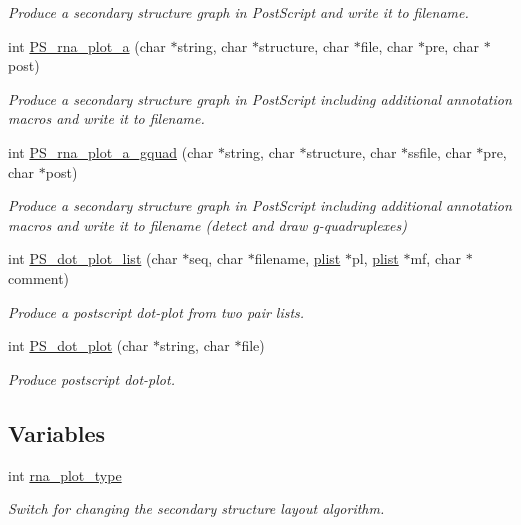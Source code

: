 \begin{DoxyCompactItemize}
\begin{DoxyCompactList}\small\item\em Produce a secondary structure graph in Post\+Script and write it to \textquotesingle{}filename\textquotesingle{}. \end{DoxyCompactList}\item 
int \hyperlink{group__plotting__utils_ga47856b2504b566588785597b6ebb8271}{P\+S\+\_\+rna\+\_\+plot\+\_\+a} (char $\ast$string, char $\ast$structure, char $\ast$file, char $\ast$pre, char $\ast$post)
\begin{DoxyCompactList}\small\item\em Produce a secondary structure graph in Post\+Script including additional annotation macros and write it to \textquotesingle{}filename\textquotesingle{}. \end{DoxyCompactList}\item 
int \hyperlink{group__plotting__utils_ga32fa0f97625119e9d24dd2e7153abc4f}{P\+S\+\_\+rna\+\_\+plot\+\_\+a\+\_\+gquad} (char $\ast$string, char $\ast$structure, char $\ast$ssfile, char $\ast$pre, char $\ast$post)
\begin{DoxyCompactList}\small\item\em Produce a secondary structure graph in Post\+Script including additional annotation macros and write it to \textquotesingle{}filename\textquotesingle{} (detect and draw g-\/quadruplexes) \end{DoxyCompactList}\item 
int \hyperlink{group__plotting__utils_ga00ea223b5cf02eb2faae5ff29f0d5e12}{P\+S\+\_\+dot\+\_\+plot\+\_\+list} (char $\ast$seq, char $\ast$filename, \hyperlink{group__data__structures_gab1d8894b43aa84cbc50b862a73785fbc}{plist} $\ast$pl, \hyperlink{group__data__structures_gab1d8894b43aa84cbc50b862a73785fbc}{plist} $\ast$mf, char $\ast$comment)
\begin{DoxyCompactList}\small\item\em Produce a postscript dot-\/plot from two pair lists. \end{DoxyCompactList}\item 
int \hyperlink{group__plotting__utils_ga689a97a7e3b8a2df14728b8204d9d57b}{P\+S\+\_\+dot\+\_\+plot} (char $\ast$string, char $\ast$file)
\begin{DoxyCompactList}\small\item\em Produce postscript dot-\/plot. \end{DoxyCompactList}\end{DoxyCompactItemize}
\subsection*{Variables}
\begin{DoxyCompactItemize}
\item 
int \hyperlink{group__plotting__utils_ga5964c4581431b098b80027d6e14dcdd4}{rna\+\_\+plot\+\_\+type}
\begin{DoxyCompactList}\small\item\em Switch for changing the secondary structure layout algorithm. \end{DoxyCompactList}\end{DoxyCompactItemize}


